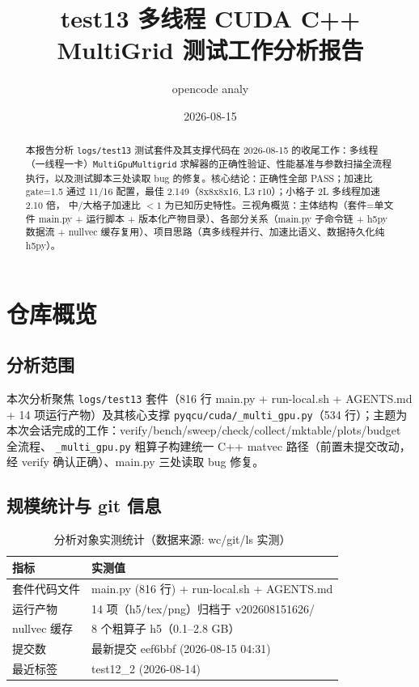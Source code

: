 \documentclass[UTF8]{ctexart}
\title{test13 多线程 CUDA C++ MultiGrid 测试工作分析报告}
\author{opencode analy}
\date{2026-08-15}
\begin{document}
\maketitle

\begin{abstract}
本报告分析 \texttt{logs/test13} 测试套件及其支撑代码在 2026-08-15 的收尾工作：多线程
（一线程一卡）\texttt{MultiGpuMultigrid} 求解器的正确性验证、性能基准与参数扫描全流程
执行，以及测试脚本三处读取 bug 的修复。核心结论：正确性全部 PASS；加速比 gate=1.5
通过 11/16 配置，最佳 2.149（8x8x8x16, L3 r10）；小格子 2L 多线程加速 2.10 倍，
中/大格子加速比 $<1$ 为已知历史特性。三视角概览：主体结构（套件=单文件 main.py +
运行脚本 + 版本化产物目录）、各部分关系（main.py 子命令链 + h5py 数据流 + nullvec
缓存复用）、项目思路（真多线程并行、加速比语义、数据持久化纯 h5py）。
\end{abstract}

\tableofcontents

\section{仓库概览}
\subsection{分析范围}
本次分析聚焦 \texttt{logs/test13} 套件（816 行 main.py + run-local.sh + AGENTS.md +
14 项运行产物）及其核心支撑 \texttt{pyqcu/cuda/\_multi\_gpu.py}（534 行）；主题为
本次会话完成的工作：verify/bench/sweep/check/collect/mktable/plots/budget 全流程、
\texttt{\_multi\_gpu.py} 粗算子构建统一 C++ matvec 路径（前置未提交改动，经 verify
确认正确）、main.py 三处读取 bug 修复。

\subsection{规模统计与 git 信息}
\begin{table}[htbp]\centering
\begin{tabular}{ll}
\toprule
指标 & 实测值 \\
\midrule
套件代码文件 & main.py (816 行) + run-local.sh + AGENTS.md \\
运行产物 & 14 项（h5/tex/png）归档于 v202608151626/ \\
nullvec 缓存 & 8 个粗算子 h5（0.1--2.8 GB） \\
提交数 & 最新提交 eef6bbf (2026-08-15 04:31) \\
最近标签 & test12\_2 (2026-08-14) \\
\bottomrule
\end{tabular}
\caption{分析对象实测统计（数据来源: wc/git/ls 实测）}
\end{table}
\end{document}
